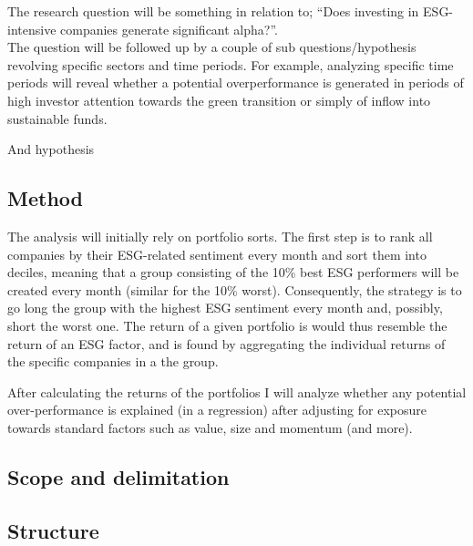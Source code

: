 The research question will be something in relation to; “Does investing in ESG-intensive companies generate significant alpha?”. \\

The question will be followed up by a couple of sub questions/hypothesis revolving specific sectors and time periods. For example, analyzing specific time periods will reveal whether a potential overperformance is generated in periods of high investor attention towards the green transition or simply of inflow into sustainable funds. 

And hypothesis
\subsection{Method}

The analysis will initially rely on portfolio sorts. The first step is to rank all companies by their ESG-related sentiment every month and sort them into deciles, meaning that a group consisting of the 10\% best ESG performers will be created every month (similar for the 10\% worst). Consequently, the strategy is to go long the group with the highest ESG sentiment every month and, possibly, short the worst one. The return of a given portfolio is would thus resemble the return of an ESG factor, and is found by aggregating the individual returns of the specific companies in a the group.  

After calculating the returns of the portfolios I will analyze whether any potential over-performance is explained (in a regression) after adjusting for exposure towards standard factors such as value, size and momentum (and more).
\subsection{Scope and delimitation}

\subsection{Structure}
